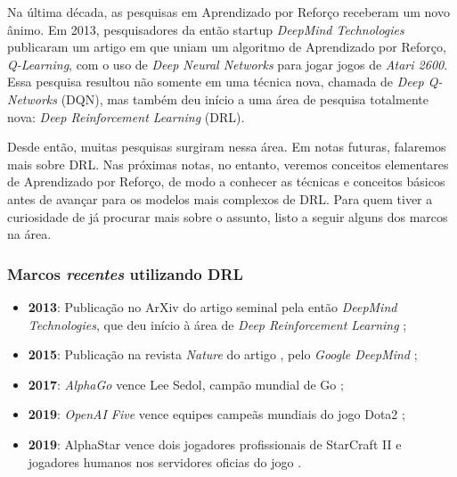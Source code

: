 \documentclass{article}
\begin{document}
            Na última década, as pesquisas em Aprendizado por Reforço receberam um novo ânimo.
            Em 2013, pesquisadores da então startup \emph{DeepMind Technologies} publicaram um artigo em que uniam um algoritmo de Aprendizado por Reforço, \emph{Q-Learning}, com o uso de \emph{Deep Neural Networks} para jogar jogos de \emph{Atari 2600}.
            Essa pesquisa resultou não somente em uma técnica nova, chamada de \emph{Deep Q-Networks} (DQN), mas também deu início a uma área de pesquisa totalmente nova: \emph{Deep Reinforcement Learning} (DRL). 
            
            Desde então, muitas pesquisas surgiram nessa área.
            Em notas futuras, falaremos mais sobre DRL.
            Nas próximas notas, no entanto, veremos conceitos elementares de Aprendizado por Reforço, de modo a conhecer as técnicas e conceitos básicos antes de avançar para os modelos mais complexos de DRL.
            Para quem tiver a curiosidade de já procurar mais sobre o assunto, listo a seguir alguns dos marcos na área.
            
            \subsubsection{Marcos \emph{recentes} utilizando DRL}
            
                \begin{itemize}
                
                    \item \textbf{2013}: Publicação no ArXiv do artigo seminal \emph{} pela então \emph{DeepMind Technologies}, que deu início à área de \emph{Deep Reinforcement Learning} \cite{Mnih2013};
                    
                    \item \textbf{2015}: Publicação na revista \emph{Nature} do artigo \emph{}, pelo \emph{Google DeepMind} \cite{Mnih2015};
                    
                    \item \textbf{2017}: \emph{AlphaGo} vence Lee Sedol, campão mundial de Go \cite{Silver2016,AlphaGo2017};
                    
                    \item \textbf{2019}: \emph{OpenAI Five} vence equipes campeãs mundiais do jogo Dota2 \cite{Openai2019};
                    
                    \item \textbf{2019}: AlphaStar vence dois jogadores profissionais de StarCraft II e jogadores humanos nos servidores oficias do jogo \cite{Vinyals2019}.
                    
                \end{itemize}
\end{document}
